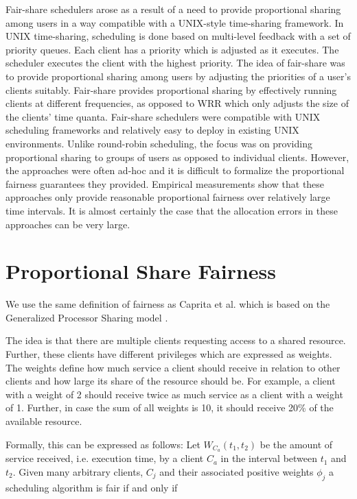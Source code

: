 Fair-share schedulers arose as a result of
a need to provide proportional sharing among users in a
way compatible with a UNIX-style time-sharing framework. In UNIX time-sharing, scheduling is done based
on multi-level feedback with a set of priority queues.
Each client has a priority which is adjusted as it executes.
The scheduler executes the client with the highest priority. The idea of fair-share was to provide proportional
sharing among users by adjusting the priorities of a user's clients suitably. Fair-share provides proportional sharing by effectively running clients at different frequencies, as opposed to WRR which only adjusts
the size of the clients’ time quanta. Fair-share schedulers were compatible with UNIX scheduling frameworks and relatively easy to deploy in existing UNIX
environments. Unlike round-robin scheduling, the focus was on providing proportional sharing to groups of
users as opposed to individual clients. However, the approaches were often ad-hoc and it is difficult to formalize the proportional fairness guarantees they provided.
Empirical measurements show that these approaches
only provide reasonable proportional fairness over relatively large time intervals. It is almost certainly the
case that the allocation errors in these approaches can be
very large.

\section{Proportional Share Fairness}

We use the same definition of fairness as Caprita et al. \cite{ccn05} which is based on the
Generalized Processor Sharing model \cite{kl76}.

The idea is that there are multiple clients requesting access to a shared resource. Further,
these clients have different privileges which are expressed as weights. The weights define
how much service a client should receive in relation to other clients and how large its share
of the resource should be. For example, a client with a weight of 2 should receive twice as
much service as a client with a weight of 1. Further, in case the sum of all weights is 10, it
should receive 20\% of the available resource.

Formally, this can be expressed as follows: Let $W_{C_a}(t_1, t_2)$ be the amount of service received, 
i.e. execution time, by a client $C_a$ in the interval between $t_1$ and $t_2$. Given
many arbitrary clients, $C_j$ and their associated positive weights $\phi_j$ a scheduling algorithm
is fair if and only if

